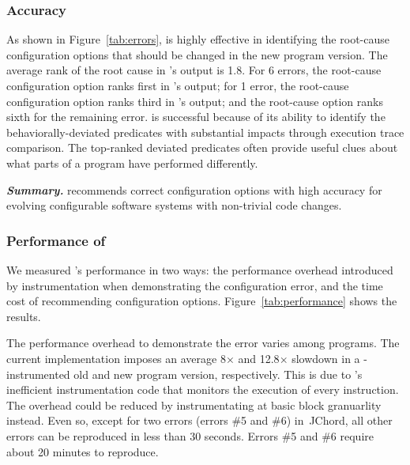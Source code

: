 \subsubsection{Accuracy}
\label{sec:accuracy}

As shown in Figure~\ref{tab:errors}, \ourtool is highly effective
in identifying the root-cause configuration options that should
be changed in the new program version. The average rank of
the root cause in \ourtool's output is 1.8. For 6 errors, the
root-cause configuration option ranks first in \ourtool's output;
for 1 error, the root-cause configuration option ranks third
in \ourtool's output; and the root-cause option ranks sixth
for the remaining error. \ourtool is successful because of its
ability to identify the behaviorally-deviated predicates with
substantial impacts through execution trace comparison.
The top-ranked deviated predicates often provide
useful clues about what parts of a program have performed
differently.




\vspace{1mm}

\noindent \textbf{\textit{Summary.}} \ourtool
recommends correct configuration options with
high accuracy for evolving configurable software systems
with non-trivial code changes.

\subsubsection{Performance of \ourtool}
\label{sec:timecost}

We measured \ourtool's performance in two ways:
the performance overhead introduced by instrumentation
when demonstrating the configuration error,
and the time cost of recommending configuration options.
Figure~\ref{tab:performance} shows the results.

The performance overhead to demonstrate the error
varies among programs. The current implementation
imposes an average 8$\times$ and 12.8$\times$ slowdown in a
\ourtool-instrumented old and new program version, respectively.
This is due to \ourtool's inefficient instrumentation code that
monitors the execution of every instruction.
The overhead could be reduced by instrumentating
at basic block granuarlity instead.
Even so, except for two errors (errors \#5 and \#6) in\
JChord,  all other errors can
be reproduced in less than 30 seconds. Errors \#5 and \#6
require about 20 minutes to reproduce.

